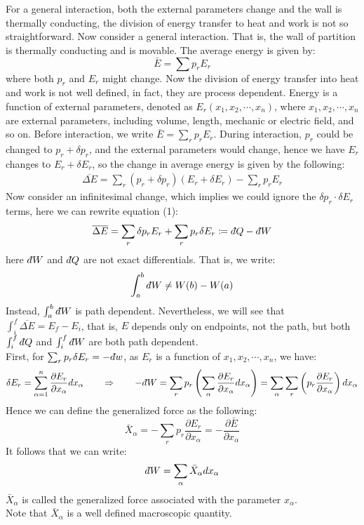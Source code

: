 \documentclass[11pt]{article}
\theoremstyle{break}
\theoremstyle{break}
\newcommand{\dbar}{d\hspace*{-0.08em}\bar{}\hspace*{0.1em}}
\begin{document}
For a general interaction, both the external parameters change and the wall is thermally conducting, the division of energy transfer to heat and work is not so straightforward. Now consider a general interaction. That is, the wall of partition is thermally conducting and is movable. The average energy is given by:
$$\bar{E} = \sum p_r E_r$$
where both $p_r$ and $E_r$ might change. Now the division of energy transfer into heat and work is not well defined, in fact, they are process dependent. Energy is a function of external parameters, denoted as $E_r(x_1,x_2,\cdots, x_n)$, where $x_1,x_2,\cdots, x_n$ are external parameters, including volume, length, mechanic or electric field, and so on. Before interaction, we write $\bar{E} = \sum_r p_r E_r$. During interaction, $p_r$ could be changed to $p_r + \delta p_r$, and the external parameters would change, hence we have $E_r$ changes to $E_r + \delta E_r$, so the change in average energy is given by the following:
\begin{align*}
\overline{\Delta E} = \sum_r (p_r +\delta p_r)(E_r+\delta E_r) - \sum_r p_r E_r \tag{1}
\end{align*}
Now consider an infinitesimal change, which implies we could ignore the $\delta p_r \cdot \delta E_r$ terms, here we can rewrite equation (1):
\begin{align*}
\overline{\Delta E} = \sum_r \delta p_r E_r + \sum_r p_r \delta E_r \coloneqq \dbar Q -\dbar W
\end{align*}
here $\dbar W$ and $\dbar Q$ are not exact differentials. That is, we write:
$$\int_a^b \dbar W \neq W(b)-W(a)$$ 
Instead, $\int_a^b \dbar W$ is path dependent. Nevertheless, we will see that $\int_i^f \overline{ \Delta E} = E_f - E_i$, that is, $E$ depends only on endpoints, not the path, but both $\int_i^f \dbar Q$ and $\int_i^f \dbar W$ are both path dependent. \\


First, for $\sum_r p_r \delta E_r = -\dbar w$, as $E_r$ is a function of $x_1,x_2,\cdots, x_n$, we have:
\begin{align*}
\delta E_r = \sum_{\alpha=1}^n \frac{\partial E_r}{\partial x_{\alpha}}dx_{\alpha} \qquad \Rightarrow \qquad -\dbar W = \sum_r p_r \left(\sum_{\alpha} \frac{\partial E_r}{\partial x_{\alpha}}dx_{\alpha}\right) = \sum_{\alpha}\sum_r\left( p_r\frac{\partial E_r}{\partial x_{\alpha}}\right)dx_{\alpha}
\end{align*}
Hence we can define the generalized force as the following: 
$$\bar{X}_{\alpha} = -\sum_r p_r \frac{\partial E_r}{\partial x_{\alpha}} = -\frac{\partial \bar{E}}{\partial x_{\alpha}}$$
It follows that we can write: 
$$\dbar W = \sum_{\alpha} \bar{X}_{\alpha} dx_{\alpha}$$
$\bar{X}_{\alpha}$ is called the generalized force associated with the parameter $x_{\alpha}$. \\
Note that $\bar{X}_{\alpha}$ is a well defined macroscopic quantity.\\
\end{document}
